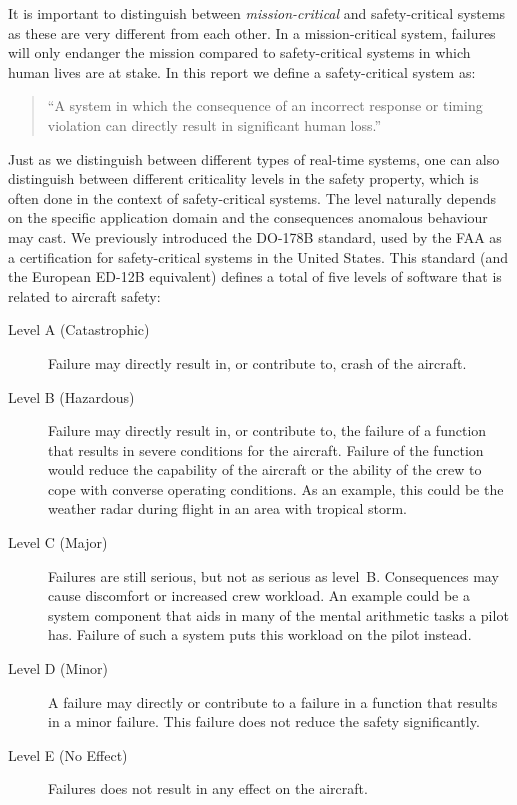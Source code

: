 It is important to distinguish between \textit{mission-critical} and safety-critical systems as these are very different from each other. In a mission-critical system, failures will only endanger the mission compared to safety-critical systems in which human lives are at stake. In this report we define a safety-critical system as:

\begin{quotation}
``A system in which the consequence of an incorrect response or timing violation can directly result in significant human loss.''
\end{quotation}

Just as we distinguish between different types of real-time systems, one can also distinguish between different criticality levels in the safety property, which is often done in the context of safety-critical systems. The level naturally depends on the specific application domain and the consequences anomalous behaviour may cast. We previously introduced the DO-178B standard, used by the FAA as a certification for safety-critical systems in the United States. This standard (and the European ED-12B equivalent) defines a total of five levels of software that is related to aircraft safety:
\begin{description}
	\item[Level A (Catastrophic)] Failure may directly result in, or contribute to, crash of the aircraft.  
	\item[Level B (Hazardous)] Failure may directly result in, or contribute to, the failure of a function that results in severe conditions for the aircraft. Failure of the function would reduce the capability of the aircraft or the ability of the crew to cope with converse operating conditions. As an example, this could be the weather radar during flight in an area with tropical storm.
	\item[Level C (Major)] Failures are still serious, but not as serious as level~B. Consequences may cause discomfort or increased crew workload. An example could be a system component that aids in many of the mental arithmetic tasks a pilot has. Failure of such a system puts this workload on the pilot instead.
	\item[Level D (Minor)] A failure may directly or contribute to a failure in a function that results in a minor failure. This failure does not reduce the safety significantly.
	\item[Level E (No Effect)] Failures does not result in any effect on the aircraft.
\end{description}

